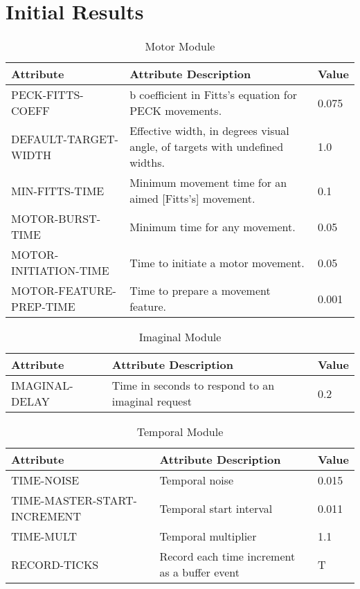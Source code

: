 \chapter{Initial Results}
\label{sec:appendixf}

\begin{longtable}{|p{5cm}|p{6cm}|p{1.5cm}|}
\caption{Motor Module} \label{tab:motor-module} \\
\hline

Attribute & Attribute Description & Value \\ \hline

PECK-FITTS-COEFF & b coefficient in Fitts's equation for PECK movements. & 0.075 \\ \hline

DEFAULT-TARGET-WIDTH & Effective width, in degrees visual angle, of targets with undefined widths. & 1.0 \\ \hline

MIN-FITTS-TIME & Minimum movement time for an aimed [Fitts's] movement. & 0.1  \\ \hline

MOTOR-BURST-TIME & Minimum time for any movement. & 0.05 \\ \hline

MOTOR-INITIATION-TIME & Time to initiate a motor movement. & 0.05 \\ \hline

MOTOR-FEATURE-PREP-TIME & Time to prepare a movement feature. & 0.001 \\ \hline

\end{longtable}

\begin{longtable}{|p{5cm}|p{6cm}|p{1.5cm}|}
\caption{Imaginal Module} \label{tab:imaginal-module} \\
\hline

Attribute & Attribute Description & Value \\ \hline

IMAGINAL-DELAY & Time in seconds to respond to an imaginal request & 0.2 \\ \hline

\end{longtable}

\begin{longtable}{|p{5cm}|p{6cm}|p{1.5cm}|}
\caption{Temporal Module} \label{tab:temporal-module} \\
\hline

Attribute & Attribute Description & Value \\ \hline

TIME-NOISE & Temporal noise & 0.015 \\ \hline

TIME-MASTER-START-INCREMENT & Temporal start interval & 0.011 \\ \hline

TIME-MULT & Temporal multiplier & 1.1 \\ \hline

RECORD-TICKS & Record each time increment as a buffer event & T \\ \hline

\end{longtable}
